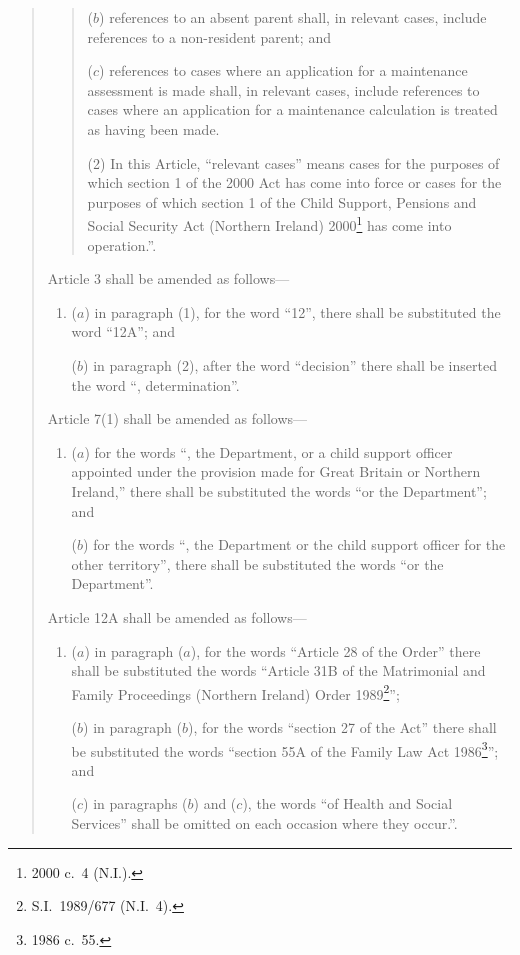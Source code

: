 \documentclass[12pt,a4paper]{article}
\begin{document}
\begin{quotation}
\begin{quotation}
\begin{enumerate}
($b$) references to an absent parent shall, in relevant cases, include references to a non-resident parent; and

($c$) references to cases where an application for a maintenance assessment is made shall, in relevant cases, include references to cases where an application for a maintenance calculation is treated as having been made.
\end{enumerate}

(2) In this Article, “relevant cases” means cases for the purposes of which section 1 of the 2000 Act has come into force or cases for the purposes of which section 1 of the Child Support, Pensions and Social Security Act (Northern Ireland) 2000\footnote{2000 c.\ 4 (N.I.).} has come into operation.”.
\end{quotation}

Article 3 shall be amended as follows—
\begin{enumerate}\item[]
($a$) in paragraph (1), for the word “12”, there shall be substituted the word “12A”; and

($b$) in paragraph (2), after the word “decision” there shall be inserted the word “, determination”.
\end{enumerate}

Article 7(1) shall be amended as follows—
\begin{enumerate}\item[]
($a$) for the words “, the Department, or a child support officer appointed under the provision made for Great Britain or Northern Ireland,” there shall be substituted the words “or the Department”; and

($b$) for the words “, the Department or the child support officer for the other territory”, there shall be substituted the words “or the Department”.
\end{enumerate}

Article 12A shall be amended as follows—
\begin{enumerate}\item[]
($a$) in paragraph ($a$), for the words “Article 28 of the Order” there shall be substituted the words “Article 31B of the Matrimonial and Family Proceedings (Northern Ireland) Order 1989\footnote{S.I.\ 1989/677 (N.I.\ 4).}”;

($b$) in paragraph ($b$), for the words “section 27 of the Act” there shall be substituted the words “section 55A of the Family Law Act 1986\footnote{1986 c.\ 55.}”; and

($c$) in paragraphs ($b$)  and ($c$), the words “of Health and Social Services” shall be omitted on each occasion where they occur.”.
\end{enumerate}
\end{quotation}
\end{document}
